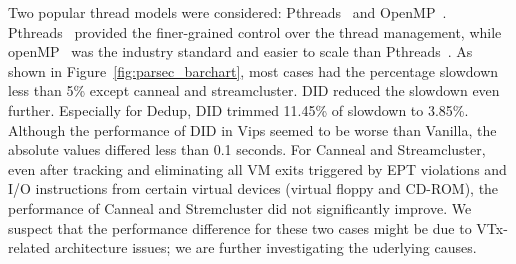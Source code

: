 Two popular thread models were considered:
Pthreads~\cite{lewis:1998} and OpenMP~\cite{dagum:1998}.
Pthreads~\cite{lewis:1998} provided the finer-grained control
over the thread management, while openMP~\cite{dagum:1998} was
the industry standard and easier to scale than
Pthreads~\cite{lewis:1998}. As shown in
Figure~\ref{fig:parsec_barchart}, most cases had the
percentage slowdown less than 5\% except canneal and
streamcluster. DID reduced the slowdown even further.
Especially for Dedup, DID trimmed 11.45\% of slowdown to
3.85\%. Although the performance of DID in Vips seemed to be
worse than Vanilla, the absolute values
differed less than 0.1 seconds.
For Canneal and Streamcluster,
even after tracking and eliminating all VM exits triggered by EPT violations
and I/O instructions from certain virtual devices
(virtual floppy and CD-ROM), the performance of 
Canneal and Stremcluster did not significantly improve.
We suspect that the performance difference for these two cases 
might be due to VTx-related architecture issues; we are
further investigating the uderlying causes.


